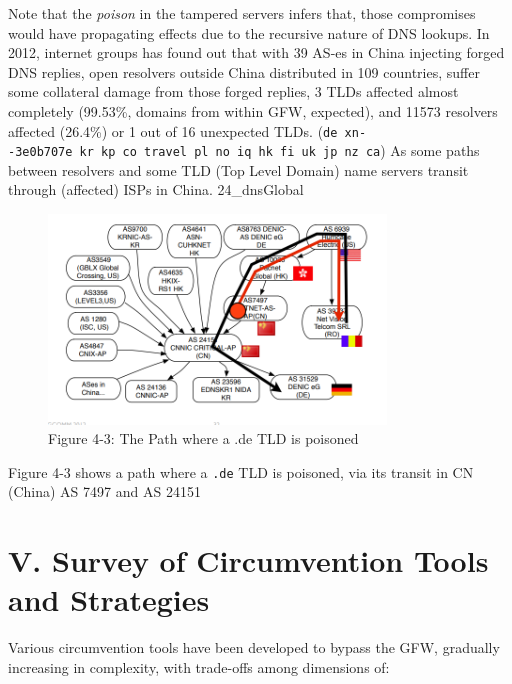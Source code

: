 \documentclass[nonacm,sigplan,screen]{acmart}
\begin{document}
Note that the \emph{poison} in the tampered servers infers that, those
compromises would have propagating effects due to the recursive nature
of DNS lookups. In 2012, internet groups has found out that with 39
AS-es in China injecting forged DNS replies, open resolvers outside
China distributed in 109 countries, suffer some collateral damage from
those forged replies, 3 TLDs affected almost completely (99.53\%,
domains from within GFW, expected), and 11573 resolvers affected
(26.4\%) or 1 out of 16 unexpected TLDs.
(\texttt{de\ xn-\/-3e0b707e\ kr\ kp\ co\ travel\ pl\ no\ iq\ hk\ fi\ uk\ jp\ nz\ ca})
As some paths between resolvers and some TLD (Top Level Domain) name
servers transit through (affected) ISPs in China. 24\_dnsGlobal

\begin{figure}
\centering
\includegraphics[width=0.8\textwidth]{res/4.3-de-poison.png}
\caption{Figure 4-3: The Path where a .de TLD is poisoned}
\end{figure}

Figure 4-3 shows a path where a \texttt{.de} TLD is poisoned, via its
transit in CN (China) AS 7497 and AS 24151

\hypertarget{v.-survey-of-circumvention-tools-and-strategies}{%
\section{V. Survey of Circumvention Tools and
Strategies}\label{v.-survey-of-circumvention-tools-and-strategies}}

Various circumvention tools have been developed to bypass the GFW,
gradually increasing in complexity, with trade-offs among dimensions of:
\cite{07_taxonomy}
\end{document}
